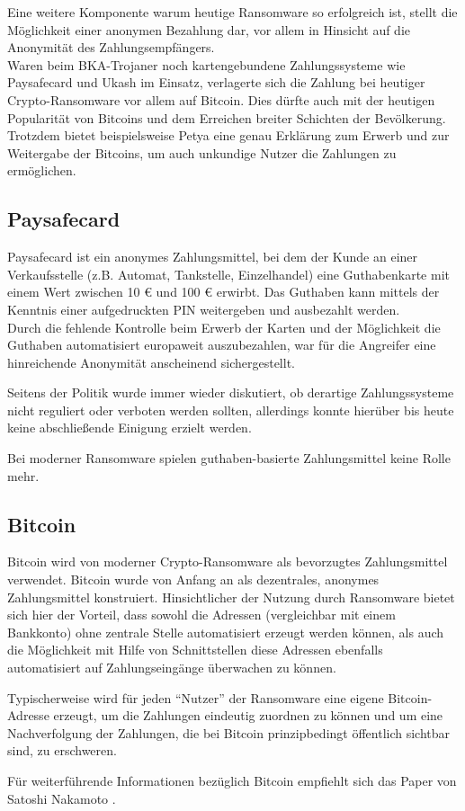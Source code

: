 Eine weitere Komponente warum heutige Ransomware so erfolgreich ist, stellt die Möglichkeit einer anonymen Bezahlung dar, vor allem in Hinsicht auf die Anonymität des Zahlungsempfängers. \\
Waren beim BKA-Trojaner noch kartengebundene Zahlungssysteme wie Paysafecard und Ukash im Einsatz, verlagerte sich die Zahlung bei heutiger Crypto-Ransomware vor allem auf Bitcoin. Dies dürfte auch mit der heutigen Popularität von Bitcoins und dem Erreichen breiter Schichten der Bevölkerung. Trotzdem bietet beispielsweise Petya eine genau Erklärung zum Erwerb und zur Weitergabe der Bitcoins, um auch unkundige Nutzer die Zahlungen zu ermöglichen. \cite{petya:infect}

\subsection{Paysafecard}
Paysafecard ist ein anonymes Zahlungsmittel, bei dem der Kunde an einer Verkaufsstelle (z.B. Automat, Tankstelle, Einzelhandel) eine Guthabenkarte mit einem Wert zwischen 10 € und 100 € erwirbt. Das Guthaben kann mittels der Kenntnis einer aufgedruckten PIN weitergeben und ausbezahlt werden. \\
Durch die fehlende Kontrolle beim Erwerb der Karten und der Möglichkeit die Guthaben automatisiert europaweit auszubezahlen, war für die Angreifer eine hinreichende Anonymität anscheinend sichergestellt. 

Seitens der Politik wurde immer wieder diskutiert, ob derartige Zahlungssysteme nicht reguliert oder verboten werden sollten, allerdings konnte hierüber bis heute keine abschließende Einigung erzielt werden. \cite{paysafecard}

Bei moderner Ransomware spielen guthaben-basierte Zahlungsmittel keine Rolle mehr.

\subsection{Bitcoin}
Bitcoin wird von moderner Crypto-Ransomware als bevorzugtes Zahlungsmittel verwendet. Bitcoin wurde von Anfang an als dezentrales, anonymes Zahlungsmittel konstruiert. Hinsichtlicher der Nutzung durch Ransomware bietet sich hier der Vorteil, dass sowohl die Adressen (vergleichbar mit einem Bankkonto) ohne zentrale Stelle automatisiert erzeugt werden können, als auch die Möglichkeit mit Hilfe von Schnittstellen diese Adressen ebenfalls automatisiert auf Zahlungseingänge überwachen zu können. 

Typischerweise wird für jeden "`Nutzer"' der Ransomware eine eigene Bitcoin-Adresse erzeugt, um die Zahlungen eindeutig zuordnen zu können und um eine Nachverfolgung der Zahlungen, die bei Bitcoin prinzipbedingt öffentlich sichtbar sind, zu erschweren. 

Für weiterführende Informationen bezüglich Bitcoin empfiehlt sich das Paper von Satoshi Nakamoto \cite{bitcoin}.
